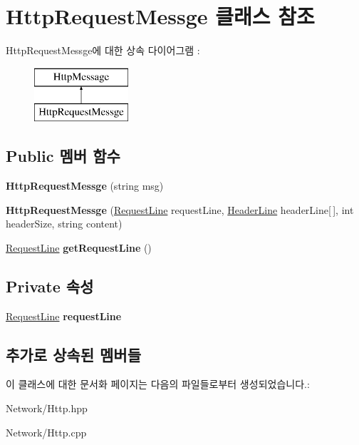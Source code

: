 \hypertarget{class_http_request_messge}{}\section{Http\+Request\+Messge 클래스 참조}
\label{class_http_request_messge}
Http\+Request\+Messge에 대한 상속 다이어그램 \+: \begin{figure}[H]
\begin{center}
\leavevmode
\includegraphics[height=2.000000cm]{class_http_request_messge}
\end{center}
\end{figure}
\subsection*{Public 멤버 함수}
\begin{DoxyCompactItemize}
\item 
\mbox{\label{class_http_request_messge_a8c98fcd8cebc292c43afd7f364131c5e}} 
{\bfseries Http\+Request\+Messge} (string msg)
\item 
\mbox{\label{class_http_request_messge_a51c4838bda72d3d2fb644c62f542600a}} 
{\bfseries Http\+Request\+Messge} (\hyperlink{struct_request_line}{Request\+Line} request\+Line, \hyperlink{struct_header_line}{Header\+Line} header\+Line\mbox{[}$\,$\mbox{]}, int header\+Size, string content)
\item 
\mbox{\label{class_http_request_messge_a19cca763425a85471753f96535d2476a}} 
\hyperlink{struct_request_line}{Request\+Line} {\bfseries get\+Request\+Line} ()
\end{DoxyCompactItemize}
\subsection*{Private 속성}
\begin{DoxyCompactItemize}
\item 
\mbox{\label{class_http_request_messge_a73a5478b34d7ffc332efcf6bfb571f6f}} 
\hyperlink{struct_request_line}{Request\+Line} {\bfseries request\+Line}
\end{DoxyCompactItemize}
\subsection*{추가로 상속된 멤버들}


이 클래스에 대한 문서화 페이지는 다음의 파일들로부터 생성되었습니다.\+:\begin{DoxyCompactItemize}
\item 
Network/Http.\+hpp\item 
Network/Http.\+cpp\end{DoxyCompactItemize}
